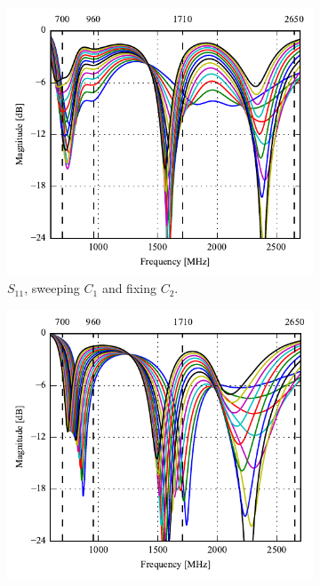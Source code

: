\begin{figure}[htbp]
    \begin{subfigure}{0.49\linewidth}
        \centering
        \includegraphics{img/tech_sol/trianglefeed/Csh1s11.pdf}
        \caption{$S_{11}$, sweeping $C_1$ and fixing $C_2$.}
    \end{subfigure}
    \hfill
    \begin{subfigure}{0.49\linewidth}
        \centering
        \includegraphics{img/tech_sol/trianglefeed/Csh2s22.pdf}

\end{subfigure}
\end{figure}
